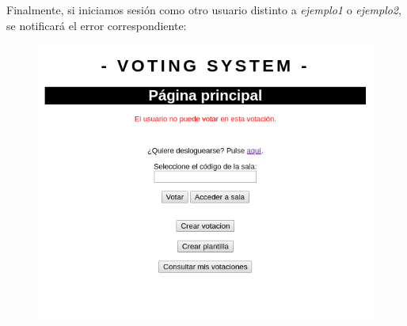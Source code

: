 \documentclass{article}
\begin{document}
 
	 Finalmente, si iniciamos sesión como otro usuario distinto a \textit{ejemplo1} o \textit{ejemplo2}, se notificará el error correspondiente:
 	\begin{figure}[H]
 		\centering
 		\includegraphics[totalheight=8cm]{img/cap18}
 		\caption{}
 	\end{figure}
 
 	
\end{document}
